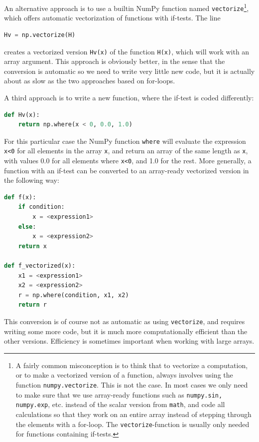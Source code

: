 \documentclass[graybox,envcountchap,sectrefs,final]{svmonodo}
\begin{document}
An alternative approach is to use a builtin NumPy function named \texttt{vectorize}\footnote{A fairly common misconception is to think that to vectorize a computation, or to make a vectorized version of a function, always involves using the function \texttt{numpy.vectorize}. This is not the case. In most cases we only need to make sure that we use array-ready functions such as \texttt{numpy.sin, numpy.exp}, etc. instead of the scalar version from \texttt{math}, and code all calculations so that they work on an entire array instead of stepping through the elements with a for-loop. The \texttt{vectorize}-function is usually only needed for functions containing if-tests.}, which offers automatic
vectorization of functions with if-tests. The line
\begin{lstlisting}[language=Python,style=blue1]
Hv = np.vectorize(H)
\end{lstlisting}
creates a vectorized version \texttt{Hv(x)} of the function \texttt{H(x)}, which will work  with an array argument.
This approach is obviously better, in the sense that the conversion is automatic so we need to write very little
new code, but it is actually about as slow as the two approaches based on for-loops.



A third approach is to write a new function, where the if-test is coded differently:
\begin{lstlisting}[language=Python,style=blue1]
def Hv(x):
    return np.where(x < 0, 0.0, 1.0)
\end{lstlisting}
For this particular case the NumPy function \texttt{where} will evaluate the expression \texttt{x<0}
for all elements in the array \texttt{x}, and return an array of the same length as \texttt{x}, with values 0.0
for all elements where \texttt{x<0}, and 1.0 for the rest. More generally, a function
with an if-test can be converted to an array-ready vectorized version in the following way:
\begin{lstlisting}[language=Python,style=blue1]
def f(x):
    if condition:
        x = <expression1>
    else:
        x = <expression2>
    return x

def f_vectorized(x):
    x1 = <expression1>
    x2 = <expression2>
    r = np.where(condition, x1, x2)
    return r
\end{lstlisting}
This conversion is of course not as automatic as using \texttt{vectorize}, and requires writing some more code,
but it is much more computationally efficient than the other versions. Efficiency is sometimes important when
working with large arrays.
\end{document}
